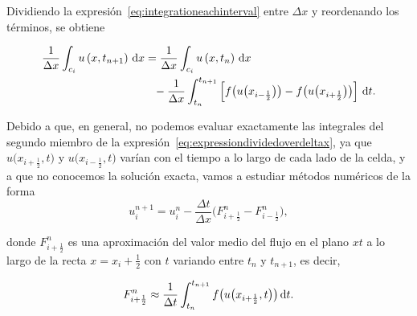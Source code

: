 \begin{frame}
    \frametitle{\secname}

    Dividiendo la expresión~\eqref{eq:integrationeachinterval} entre
    $\Delta x$ y reordenando los términos, se obtiene

    \begin{gather}\label{eq:expressiondividedoverdeltax}
        \begin{split}
            \frac{1}{\Delta x}
            \int_{c_{i}}
            u
            \left(x,t_{n+1}\right)
            \dl x
             & =
            \frac{1}{\Delta x}
            \int_{c_{i}}
            u
            \left(x,t_{n}\right)
            \dl x          \\
             & \phantom{=}
            -\frac{1}{\Delta x}
            \int_{t_{n}}^{t_{n+1}}
            \left[
                f
                \big(
                u\big(x_{i-\frac{1}{2}}\big)
                \big)-
                f
                \big(
                u\big(x_{i+\frac{1}{2}}\big)
                \big)
                \right]
            \dl t.
        \end{split}
    \end{gather}

    Debido a que, en general, no podemos evaluar exactamente las
    integrales del segundo miembro de la
    expresión~\eqref{eq:expressiondividedoverdeltax}, ya que
    \begin{math}
        u
        \big(x_{i+\frac{1}{2}},t\big)
    \end{math}
    y
    \begin{math}
        u
        \big(x_{i-\frac{1}{2}},t\big)
    \end{math}
    varían con el
    tiempo a lo largo de cada lado de la celda, y a que no conocemos la
    solución exacta, vamos a estudiar métodos numéricos de la forma
    \begin{equation}\label{eq:godunovscheme}
        u^{n+1}_{i}=
        u^{n}_{i}-
        \frac{\Delta t}{\Delta x}
        \big(
        F^{n}_{i+\frac{1}{2}}-
        F^{n}_{i-\frac{1}{2}}
        \big),
    \end{equation}

    donde $F^{n}_{i+\frac{1}{2}}$ es una aproximación del valor medio del
    flujo en el plano $xt$ a lo largo de la recta $x=x_{i}+\frac{1}{2}$
    con $t$ variando entre $t_{n}$ y $t_{n+1}$, es decir,

    \begin{equation}\label{eq:numericalflux}
        F^{n}_{i+\frac{1}{2}}\approx
        \frac{1}{\Delta t}
        \int_{t_{n}}^{t_{n+1}}
        f
        \big(
        u
        \big(x_{i+\frac{1}{2}},t\big)
        \big)
        \dl t.
    \end{equation}
\end{frame}

